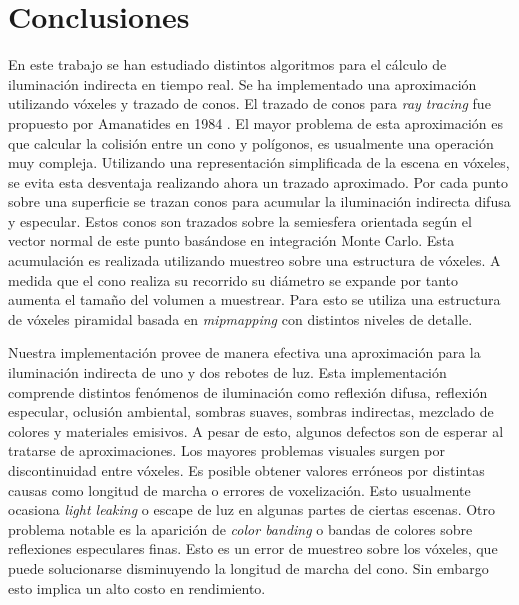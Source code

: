 \chapter{Conclusiones}
\label{chap:conclusion}
En este trabajo se han estudiado distintos algoritmos para el cálculo de iluminación indirecta en tiempo real. Se ha implementado una aproximación utilizando vóxeles y trazado de conos. El trazado de conos para \emph{ray tracing} fue propuesto por Amanatides en 1984 \cite{Amanatides:1984:RTC:800031.808589}. El mayor problema de esta aproximación es que calcular la colisión entre un cono y polígonos, es usualmente una operación muy compleja. Utilizando una representación simplificada de la escena en vóxeles, se evita esta desventaja realizando ahora un trazado aproximado. Por cada punto sobre una superficie se trazan conos para acumular la iluminación indirecta difusa y especular. Estos conos son trazados sobre la semiesfera orientada según el vector normal de este punto basándose en integración Monte Carlo. Esta acumulación es realizada utilizando muestreo sobre una estructura de vóxeles. A medida que el cono realiza su recorrido su diámetro se expande por tanto aumenta el tamaño del volumen a muestrear. Para esto se utiliza una estructura de vóxeles piramidal basada en \emph{mipmapping} con distintos niveles de detalle.

Nuestra implementación provee de manera efectiva una aproximación para la iluminación indirecta de uno y dos rebotes de luz. Esta implementación comprende distintos fenómenos de iluminación como reflexión difusa, reflexión especular, oclusión ambiental, sombras suaves, sombras indirectas, mezclado de colores y materiales emisivos. A pesar de esto, algunos defectos son de esperar al tratarse de aproximaciones. Los mayores problemas visuales surgen por discontinuidad entre vóxeles. Es posible obtener valores erróneos por distintas causas como longitud de marcha o errores de voxelización. Esto usualmente ocasiona \emph{light leaking} o escape de luz en algunas partes de ciertas escenas. Otro problema notable es la aparición de \emph{color banding} o bandas de colores sobre reflexiones especulares finas. Esto es un error de muestreo sobre los vóxeles, que puede solucionarse disminuyendo la longitud de marcha del cono. Sin embargo esto implica un alto costo en rendimiento.

